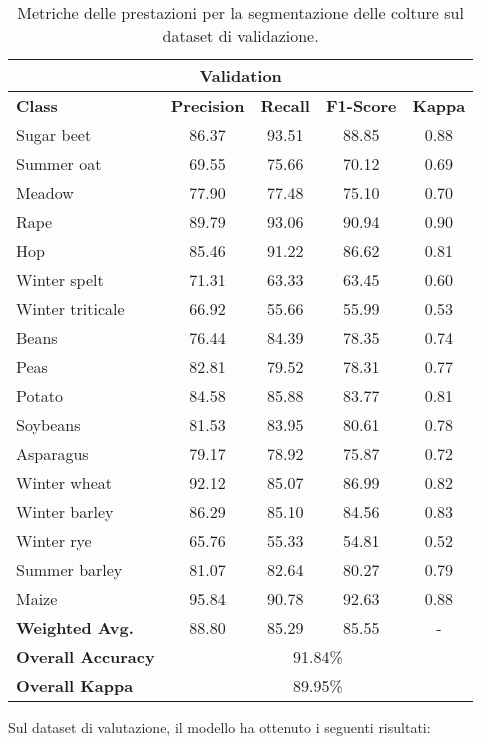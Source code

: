 \begin{table}[H]
    \centering
    \setlength{\tabcolsep}{5pt} %
    \renewcommand{\arraystretch}{1.2} %
    \begin{tabular}{|l||c|c|c|c||}
    \hline
    \multicolumn{5}{|c|}{\textbf{Validation}} \\
    \hline
    \textbf{Class} & \textbf{Precision} & \textbf{Recall} & \textbf{F1-Score} & \textbf{Kappa} \\
    \hline
    Sugar beet    & 86.37 & 93.51 & 88.85 & 0.88 \\
    Summer oat    & 69.55 & 75.66 & 70.12 & 0.69 \\
    Meadow        & 77.90 & 77.48 & 75.10 & 0.70 \\
    Rape          & 89.79 & 93.06 & 90.94 & 0.90 \\
    Hop           & 85.46 & 91.22 & 86.62 & 0.81 \\
    Winter spelt  & 71.31 & 63.33 & 63.45 & 0.60 \\
    Winter triticale & 66.92 & 55.66 & 55.99 & 0.53 \\
    Beans         & 76.44 & 84.39 & 78.35 & 0.74 \\
    Peas          & 82.81 & 79.52 & 78.31 & 0.77 \\
    Potato        & 84.58 & 85.88 & 83.77 & 0.81 \\
    Soybeans      & 81.53 & 83.95 & 80.61 & 0.78 \\
    Asparagus     & 79.17 & 78.92 & 75.87 & 0.72 \\
    Winter wheat  & 92.12 & 85.07 & 86.99 & 0.82 \\
    Winter barley & 86.29 & 85.10 & 84.56 & 0.83 \\
    Winter rye    & 65.76 & 55.33 & 54.81 & 0.52 \\
    Summer barley & 81.07 & 82.64 & 80.27 & 0.79 \\
    Maize         & 95.84 & 90.78 & 92.63 & 0.88 \\
    \hline
    \textbf{Weighted Avg.} & 88.80 & 85.29 & 85.55 & - \\
    \hline
    \textbf{Overall Accuracy} & \multicolumn{4}{|c||}{91.84\%} \\
    \textbf{Overall Kappa}    & \multicolumn{4}{|c||}{89.95\%} \\
    \hline
    \end{tabular}
    \caption{Metriche delle prestazioni per la segmentazione delle colture sul dataset di 
    validazione.}
    \label{tab:crop_segmentation_2016_val}
\end{table}
\newpage
Sul dataset di valutazione, il modello ha ottenuto i seguenti risultati: 

